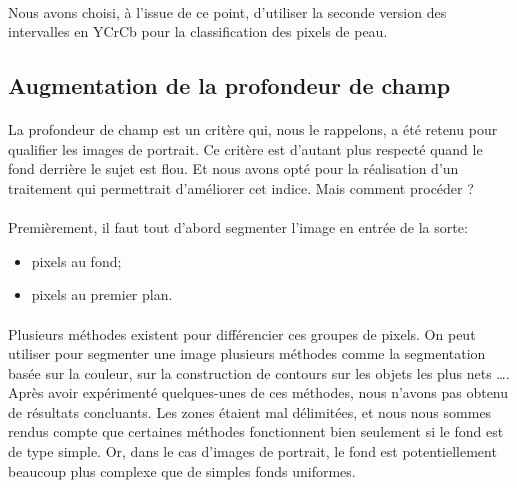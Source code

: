 \documentclass[11pt, french]{report-rd-info}
\begin{document}
\paragraph*{}
Nous avons choisi, à l'issue de ce point, d'utiliser la seconde version des intervalles en YCrCb pour la classification des pixels de peau.

\subsection{Augmentation de la profondeur de champ}
\label{part:profondeur}
\paragraph*{}
La profondeur de champ est un critère qui, nous le rappelons, a été retenu pour qualifier les images de portrait. Ce critère est d'autant plus respecté quand le fond derrière le sujet est flou. Et nous avons opté pour la réalisation d'un traitement qui permettrait d'améliorer cet indice. Mais comment procéder ?

\paragraph*{}
Premièrement, il faut tout d'abord segmenter l'image en entrée de la sorte: 
\begin{itemize}
\item pixels au fond;
\item pixels au premier plan.
\end{itemize} 

\paragraph*{}
Plusieurs méthodes existent pour différencier ces groupes de pixels. On peut utiliser pour segmenter une image plusieurs méthodes comme la segmentation basée sur la couleur, sur la construction de contours sur les objets les plus nets \dots. 
Après avoir expérimenté quelques-unes de ces méthodes, nous n'avons pas obtenu de résultats concluants. Les zones étaient mal délimitées, et nous nous sommes rendus compte que certaines méthodes fonctionnent bien seulement si le fond est de type simple. Or, dans le cas d'images de portrait, le fond est potentiellement beaucoup plus complexe que de simples fonds uniformes.
\end{document}
